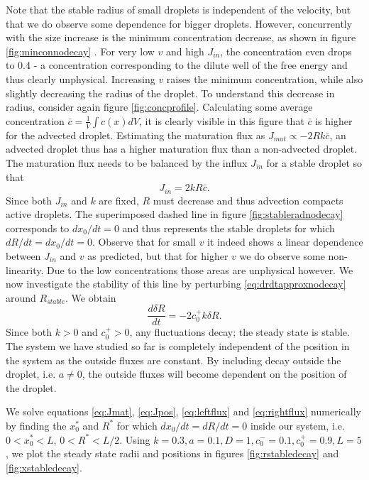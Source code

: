 \documentclass{Dissertate}
\begin{document}
Note that the stable radius of small droplets is independent of the
velocity, but that we do observe some dependence for bigger droplets.
However, concurrently with the size increase is the minimum
concentration decrease, as shown in figure \ref{fig:minconnodecay} .
For very low \(v\) and high \(J_{in}\), the concentration even drops to
0.4 - a concentration corresponding to the dilute well of the free
energy and thus clearly unphysical. Increasing \(v\) raises the minimum
concentration, while also slightly decreasing the radius of the droplet.
To understand this decrease in radius, consider again figure
\ref{fig:concprofile}. Calculating some average concentration
\(\bar{c}=\frac{1}{V}\int c(x)dV\), it is clearly visible in this figure that $\bar{c}$ is
higher for the advected droplet. Estimating the maturation flux as
\(J_{mat}\propto -2Rk\bar{c}\), an advected droplet thus has a higher
maturation flux than a non-advected droplet. The maturation flux needs
to be balanced by the influx \(J_{in}\) for a stable droplet so that
\begin{equation}
J_{in}=2kR\bar{c}.
\label{eq:jmathandwavy}\end{equation}
 Since both \(J_{in}\) and \(k\)
are fixed, \(R\) must decrease and thus advection compacts active
droplets. The superimposed dashed line in figure
\ref{fig:stableradnodecay} corresponds to \(dx_0/dt=0\) and thus
represents the stable droplets for which \(dR/dt=dx_0/dt=0\). Observe
that for small \(v\) it indeed shows a linear dependence between
\(J_{in}\) and \(v\) as predicted, but that for higher \(v\) we do
observe some non-linearity. Due to the low concentrations those areas
are unphysical however. We now investigate the stability of this line by
perturbing \ref{eq:drdtapproxnodecay} around \(R_{stable}\). We
obtain 
\[
\frac{d\delta R}{dt}=-2c_0^+k\delta R.
\] 
Since both \(k>0\) and \(c_0^+>0\), any fluctuations decay; the
steady state is stable. The system we have studied so far is completely
independent of the position in the system as the outside fluxes are
constant. By including decay outside the droplet, i.e. \(a\neq 0\), the
outside fluxes will become dependent on the position of the droplet.

We solve equations \ref{eq:Jmat}, \ref{eq:Jpos},
\ref{eq:leftflux} and \ref{eq:rightflux} numerically by finding
the \(x_0^*\) and \(R^{*}\) for which \(dx_0/dt=dR/dt=0\) inside our
system, i.e. \(0<x_0^*<L\), \(0<R^*<L/2\). Using
\(k=0.3, a=0.1, D=1 ,c_0^-=0.1,c_0^+=0.9, L=5\) , we plot the steady
state radii and positions in figures \ref{fig:rstabledecay} and
\ref{fig:xstabledecay}.
\end{document}
